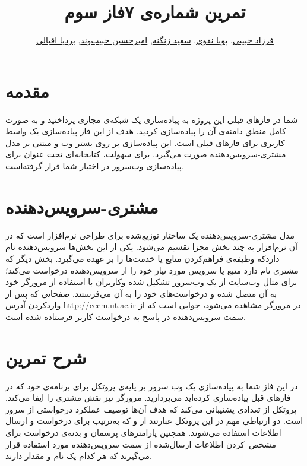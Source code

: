 \documentclass{utap}
\title{تمرین شماره‌ی ۷\normalsize\qquad فاز سوم}
\author{%
        \href{mailto:farzadhabibii98@gmail.com?subject=[AP\%20S98\%20A7]\%20}{فرزاد حبیبی},
        \href{mailto:naghavi.pooya@gmail.com?subject=[AP\%20S98\%20A7]\%20}{پویا نقوی},
    \href{mailto:zangenehsaeed412@gmail.com?subject=[AP\%20S98\%20A7]\%20}{سعید زنگنه},
        \href{mailto:ahhabibvand@gmail.com?subject=[AP\%20S98\%20A7]\%20}{امیرحسین حبیب‌وند},
    \href{mailto:bardia.eghbali@gmail.com?subject=[AP\%20S98\%20A7]\%20}{بردیا اقبالی}%
}
\begin{document}
    \maketitle
    \section*{مقدمه}

        شما در فاز‌های قبلی این پروژه به پیاده‌سازی یک شبکه‌ی مجازی پرداختید و به صورت کامل منطق دامنه‌ی آن را پیاده‌سازی کردید.
        هدف از این فاز پیاده‌سازی یک واسط کاربری برای فاز‌های قبلی است. این پیاده‌سازی بر روی بستر وب و مبتنی بر مدل مشتری-سرویس‌دهنده صورت می‌گیرد.
        برای سهولت، کتابخانه‌ای تحت عنوان \href{https://github.com/UTAP/APHTTP}{} برای پیاده‌سازی وب‌سرور در اختیار شما قرار گرفته‌است.
    
    
    \section*{مشتری-سرویس‌دهنده}
            مدل مشتری‌-‌سرویس‌دهنده یک ساختار توزیع‌شده برای طراحی نرم‌افزار است که در آن نرم‌افزار به چند بخش مجزا تقسیم می‌شود. یکی از این بخش‌ها سرویس‌دهنده نام داردکه وظیفه‌ی فراهم‌کردن منابع یا خدمت‌ها را بر عهده می‌گیرد. بخش دیگر که مشتری نام دارد منبع یا سرویس مورد نیاز خود را از سرویس‌دهنده درخواست می‌کند؛ برای مثال وب‌سایت  از یک وب‌سرور تشکیل شده وکاربران با استفاده از مرورگر خود به آن متصل شده و درخواست‌های خود را به آن می‌فرستند. صفحاتی که پس از واردکردن آدرس
    \url{http://cecm.ut.ac.ir} 
     در مرورگر مشاهده می‌شود، جوابی است که از سمت سرویس‌دهنده در پاسخ به درخواست کاربر فرستاده شده است.


    \section{شرح تمرین}

        در این فاز شما به پیادەسازی یک وب سرور بر پایه‌ی پروتکل
        برای برنامه‌ی خود که در فازهای قبل پیادەسازی کردەاید می‌پردازید. مرورگر نیز نقش مشتری را ایفا می‌کند. پروتکل  از تعدادی  پشتیبانی می‌کند که هدف آن‌ها توصیف عملکرد درخواستی از سرور است. دو  ارتباطی مهم در این پروتکل عبارتند از  و  که به‌ترتیب برای درخواست و ارسال اطلاعات استفاده می‌شوند. همچنین پارامتر‌های پرسمان و بدنه‌ی درخواست برای مشخص~کردن اطلاعات ارسال‌شده از سمت سرویس‌دهنده مورد استفاده قرار می‌گیرند که هر کدام یک نام و مقدار دارند. 
        
\end{document}
